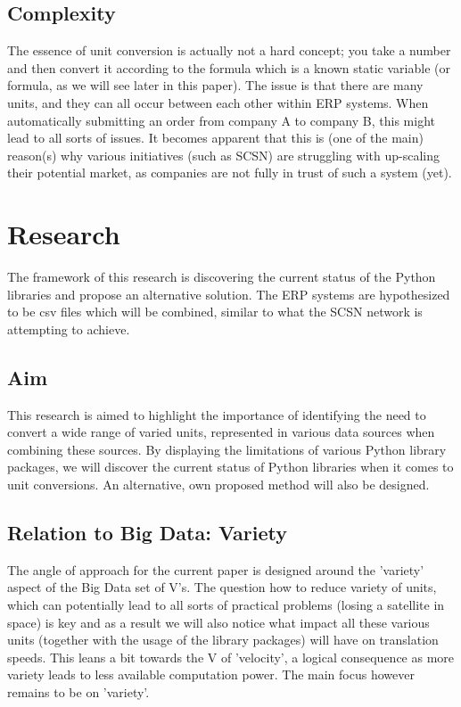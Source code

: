 \documentclass[sigchi, nonacm]{acmart}
\begin{document}
\subsection{Complexity}
The essence of unit conversion is actually not a hard concept; you take a number and then convert it according to the formula which is a known static variable (or formula, as we will see later in this paper). The issue is that there are many units, and they can all occur between each other within ERP systems. When automatically submitting an order from company A to company B, this might lead to all sorts of issues. It becomes apparent that this is (one of the main) reason(s) why various initiatives (such as SCSN) are struggling with up-scaling their potential market, as companies are not fully in trust of such a system (yet).


\section{Research}
The framework of this research is discovering the current status of the Python libraries and propose an alternative solution. The ERP systems are hypothesized to be csv files which will be combined, similar to what the SCSN network is attempting to achieve.

\subsection{Aim}
This research is aimed to highlight the importance of identifying the need to convert a wide range of varied units, represented in various data sources when combining these sources. By displaying the limitations of various Python library packages, we will discover the current status of Python libraries when it comes to unit conversions. An alternative, own proposed method will also be designed.

\subsection{Relation to Big Data: Variety}
The angle of approach for the current paper is designed around the 'variety' aspect of the Big Data set of V's. The question how to reduce variety of units, which can potentially lead to all sorts of practical problems (losing a satellite in space) is key and as a result we will also notice what impact all these various units (together with the usage of the library packages) will have on translation speeds. This leans a bit towards the V of 'velocity', a logical consequence as more variety leads to less available computation power. The main focus however remains to be on 'variety'.
\end{document}

